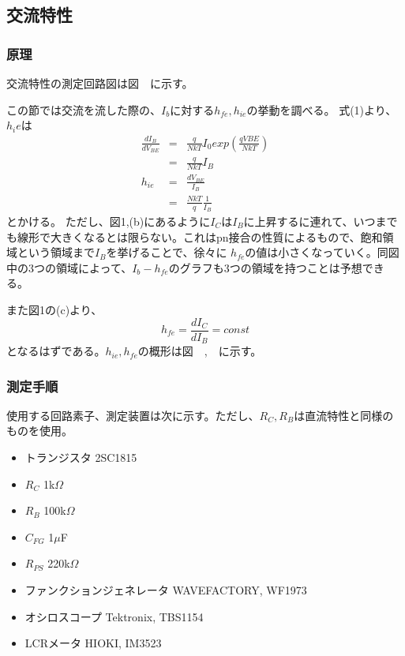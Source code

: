 \documentclass[11pt,a4j,titlepage]{jsarticle}
\begin{document}
  
  \clearpage
  
  \subsection{交流特性}
 
   \subsubsection{原理}
   交流特性の測定回路図は図\ \ に示す。
   
   この節では交流を流した際の、$I_b$に対する$h_{fe},h_{ie}$の挙動を調べる。
   式(1)より、$h_ie$は
   \begin{eqnarray}
    \frac{dI_B}{dV_{BE}} &=& \frac{q}{NkT} I_0 exp(\frac{qV{BE}}{NkT}) \nonumber \\
    &=& \frac{q}{NkT} I_B \\
    h_{ie} &=& \frac{dV_{BE}}{I_B} \nonumber \\
         &=& \frac{NkT}{q} \frac{1}{I_B}
   \end{eqnarray}
   とかける。
   ただし、図1,(b)にあるように$I_C$は$I_B$に上昇するに連れて、いつまでも線形で大きくなるとは限らない。これはpn接合の性質によるもので、飽和領域という領域まで$I_B$を挙げることで、徐々に
   $h_{fe}$の値は小さくなっていく。同図中の3つの領域によって、$I_b-h_{fe}$のグラフも3つの領域を持つことは予想できる。
   
   また図1の(c)より、
   \begin{equation}
    h_{fe} = \frac{dI_C}{dI_B} = const 
   \end{equation}
   となるはずである。$h_{ie},h_{fe}$の概形は図\ \ ,\ \ に示す。
  
  
  \newpage
  
   \subsubsection{測定手順}
  使用する回路素子、測定装置は次に示す。ただし、$R_C,R_B$は直流特性と同様のものを使用。
  \begin{itemize}
   \item トランジスタ 2SC1815
   \item $R_C$ 1k$\Omega$
   \item $R_B$ 100k$\Omega$
   \item $C_{FG}$ 1$\mu$F
   \item $R_{PS}$ 220k$\Omega$
   \item ファンクションジェネレータ WAVEFACTORY, WF1973
   \item オシロスコープ Tektronix, TBS1154
   \item LCRメータ HIOKI, IM3523
  \end{itemize}
  
\end{document}
